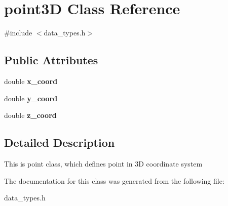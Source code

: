 \hypertarget{classpoint3_d}{}\section{point3D Class Reference}
\label{classpoint3_d}


{\ttfamily \#include $<$data\+\_\+types.\+h$>$}

\subsection*{Public Attributes}
\begin{DoxyCompactItemize}
\item 
\mbox{\label{classpoint3_d_ade532131802517c3d354093d6a4beb4e}} 
double {\bfseries x\+\_\+coord}
\item 
\mbox{\label{classpoint3_d_a8edd0a803b449cf8e4f00af270db7cf8}} 
double {\bfseries y\+\_\+coord}
\item 
\mbox{\label{classpoint3_d_aaa27482b7e34465c064d88a38de7e295}} 
double {\bfseries z\+\_\+coord}
\end{DoxyCompactItemize}


\subsection{Detailed Description}
This is point class, which defines point in 3D coordinate system 

The documentation for this class was generated from the following file\+:\begin{DoxyCompactItemize}
\item 
data\+\_\+types.\+h\end{DoxyCompactItemize}

